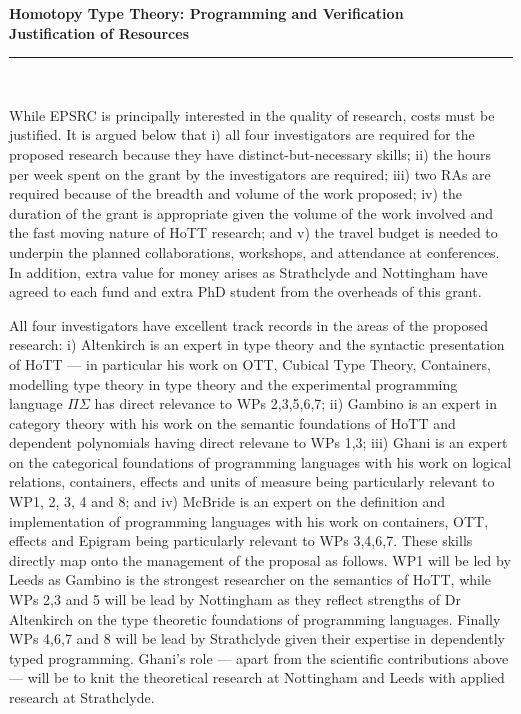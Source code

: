 \documentclass[a4paper,11pt]{article}
\begin{document}
\thispagestyle{plain}
\begin{center}
  {\Large \bf Homotopy Type Theory: Programming and Verification\\
\vspace{0.2in}
  Justification of Resources}\\[1ex]

\vspace*{-0.1in}

\rule{160mm}{.5mm}\\[2ex]
\end{center}

\noindent While EPSRC is principally interested in the quality of
research, costs must be justified. It is argued below that i) all four
investigators are required for the proposed research because they have
distinct-but-necessary skills; ii) the hours per week spent on
the grant by the investigators are required; iii)  two RAs are required because of the
breadth and volume of the work proposed; iv) the duration of the
grant is appropriate given the volume of the work involved and the
fast moving nature of HoTT research; and v) the travel budget
is needed to underpin the planned collaborations, workshops, and
attendance at conferences. In addition, extra value for money arises
as Strathclyde and Nottingham have agreed to
each fund and extra PhD student from the overheads of this grant.

\vspace{0.02in}

 All four investigators have
excellent track records in the areas of the proposed research: i)
Altenkirch is an expert in type theory and the syntactic presentation
of HoTT --- in particular his work on OTT, Cubical Type Theory,
Containers, modelling type theory in type theory and the experimental
programming language $\Pi\Sigma$ has direct relevance to WPs
2,3,5,6,7; ii) Gambino is an expert in category theory with his work
on the semantic foundations of HoTT and dependent polynomials having
direct relevane to WPs 1,3; iii) Ghani is an expert on the
categorical foundations of programming languages with his work on
logical relations, containers, effects and units of measure being
particularly relevant to WP1, 2, 3, 4 and 8; and iv) McBride is an
expert on the definition and implementation of programming languages
with his work on containers, OTT, effects and Epigram being
particularly relevant to WPs 3,4,6,7. These skills directly map onto
the management of the proposal as follows. WP1 will be led
by Leeds as Gambino is the strongest researcher on the semantics of
HoTT, while WPs 2,3 and 5 will be lead by Nottingham as they reflect
strengths of Dr Altenkirch on the type theoretic foundations of
programming languages. Finally WPs 4,6,7 and 8 will be lead by
Strathclyde given their expertise in dependently typed
programming. Ghani's role --- apart from the scientific
contributions above --- will be to knit the theoretical
research at Nottingham and Leeds with applied
research at Strathclyde.
\end{document}
